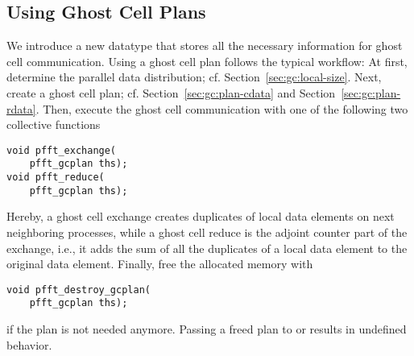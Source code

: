 \subsection{Using Ghost Cell Plans}
We introduce a new datatype  that stores all the necessary information for ghost cell communication.
Using a ghost cell plan follows the typical workflow: At first, determine the parallel data distribution; cf. Section~\ref{sec:gc:local-size}.
Next, create a ghost cell plan; cf. Section~\ref{sec:gc:plan-cdata} and Section~\ref{sec:gc:plan-rdata}.
Then, execute the ghost cell communication with one of the following two collective functions
\begin{lstlisting}
void pfft_exchange(
    pfft_gcplan ths);
void pfft_reduce(
    pfft_gcplan ths);
\end{lstlisting}
Hereby, a ghost cell exchange creates duplicates of local data elements on next neighboring processes,  
while a ghost cell reduce is the adjoint counter part of the exchange, i.e.,
it adds the sum of all the duplicates of a local data element to the original data element.
Finally, free the allocated memory with
\begin{lstlisting}
void pfft_destroy_gcplan(
    pfft_gcplan ths);
\end{lstlisting}
if the plan is not needed anymore.
Passing a freed plan to  or  results in undefined behavior.

